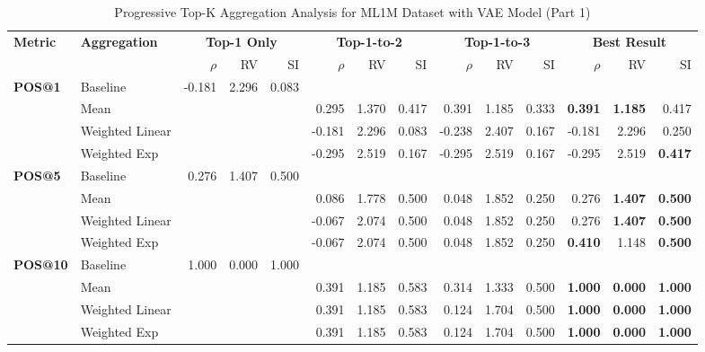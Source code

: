\documentclass{article}
\begin{document}
\begin{table}[htbp]
\centering
\caption{Progressive Top-K Aggregation Analysis for ML1M Dataset with VAE Model (Part 1)}
\label{tab:ml1m_vae_progressive_topk_1}
\footnotesize
\begin{tabular}{@{}llrrr|rrr|rrr|rrr@{}}
\toprule
\multirow{2}{*}{\textbf{Metric}} & \multirow{2}{*}{\textbf{Aggregation}} & \multicolumn{3}{c|}{\textbf{Top-1 Only}} & \multicolumn{3}{c|}{\textbf{Top-1-to-2}} & \multicolumn{3}{c|}{\textbf{Top-1-to-3}} & \multicolumn{3}{c}{\textbf{Best Result}} \\
\cmidrule(lr){3-5} \cmidrule(lr){6-8} \cmidrule(lr){9-11} \cmidrule(lr){12-14}
& & $\rho$ & RV & SI & $\rho$ & RV & SI & $\rho$ & RV & SI & $\rho$ & RV & SI \\
\midrule

\multirow{4}{*}{\textbf{POS@1}} 
& Baseline & -0.181 & 2.296 & 0.083 & & & & & & & & & \\
& Mean & & & & 0.295 & 1.370 & 0.417 & 0.391 & 1.185 & 0.333 & \textbf{0.391} & \textbf{1.185} & 0.417 \\
& Weighted Linear & & & & -0.181 & 2.296 & 0.083 & -0.238 & 2.407 & 0.167 & -0.181 & 2.296 & 0.250 \\
& Weighted Exp & & & & -0.295 & 2.519 & 0.167 & -0.295 & 2.519 & 0.167 & -0.295 & 2.519 & \textbf{0.417} \\
\midrule

\multirow{4}{*}{\textbf{POS@5}} 
& Baseline & 0.276 & 1.407 & 0.500 & & & & & & & & & \\
& Mean & & & & 0.086 & 1.778 & 0.500 & 0.048 & 1.852 & 0.250 & 0.276 & \textbf{1.407} & \textbf{0.500} \\
& Weighted Linear & & & & -0.067 & 2.074 & 0.500 & 0.048 & 1.852 & 0.250 & 0.276 & \textbf{1.407} & \textbf{0.500} \\
& Weighted Exp & & & & -0.067 & 2.074 & 0.500 & 0.048 & 1.852 & 0.250 & \textbf{0.410} & 1.148 & \textbf{0.500} \\
\midrule

\multirow{4}{*}{\textbf{POS@10}} 
& Baseline & 1.000 & 0.000 & 1.000 & & & & & & & & & \\
& Mean & & & & 0.391 & 1.185 & 0.583 & 0.314 & 1.333 & 0.500 & \textbf{1.000} & \textbf{0.000} & \textbf{1.000} \\
& Weighted Linear & & & & 0.391 & 1.185 & 0.583 & 0.124 & 1.704 & 0.500 & \textbf{1.000} & \textbf{0.000} & \textbf{1.000} \\
& Weighted Exp & & & & 0.391 & 1.185 & 0.583 & 0.124 & 1.704 & 0.500 & \textbf{1.000} & \textbf{0.000} & \textbf{1.000} \\
\midrule


\end{tabular}
\end{table}
\end{document}
